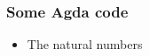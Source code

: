 \documentclass[xetex, mathserif, serif]{beamer}
\begin{document}
    \begin{frame}\frametitle{Some Agda code}

      \begin{itemize}
        \item The natural numbers
      \end{itemize}



    \end{frame}
    
\end{document}
